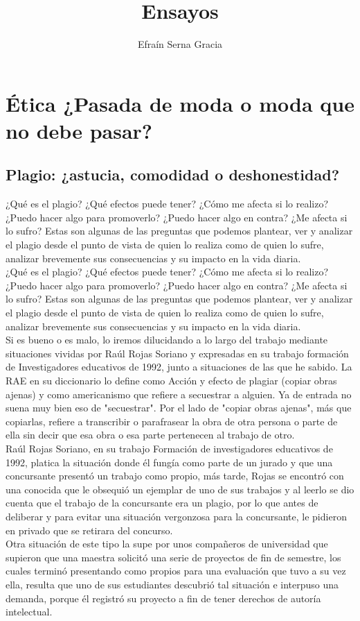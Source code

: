 \documentclass[12pt]{book} %
\title{Ensayos}
\author{Efraín Serna Gracia}
\begin{document}
\maketitle
\tableofcontents

\chapter{Ética ¿Pasada de moda o moda que no debe pasar?}

\section{Plagio: ¿astucia, comodidad o deshonestidad?}
¿Qué es el plagio? ¿Qué efectos puede tener? ¿Cómo me afecta si lo realizo? ¿Puedo hacer algo para promoverlo? ¿Puedo hacer algo en contra? ¿Me afecta si lo sufro? Estas son algunas de las preguntas que podemos plantear, ver y analizar el plagio desde el punto de vista de quien lo realiza como de quien lo sufre, analizar brevemente sus consecuencias y su impacto en la vida diaria.\\

¿Qué es el plagio? ¿Qué efectos puede tener? ¿Cómo me afecta si lo realizo? ¿Puedo hacer algo para promoverlo? ¿Puedo hacer algo en contra? ¿Me afecta si lo sufro? Estas son algunas de las preguntas que podemos plantear, ver y analizar el plagio desde el punto de vista de quien lo realiza como de quien lo sufre, analizar brevemente sus consecuencias y su impacto en la vida diaria.\\

Si es bueno o es malo, lo iremos dilucidando a lo largo del trabajo mediante situaciones vividas por Raúl Rojas Soriano y expresadas en su trabajo formación de Investigadores educativos de 1992, junto a situaciones de las que he sabido.
La RAE en su diccionario lo define como Acción y efecto de plagiar (copiar obras ajenas) y como americanismo que refiere a secuestrar a alguien. Ya de entrada no suena muy bien eso de "secuestrar". Por el lado de "copiar obras ajenas", más que copiarlas, refiere a transcribir o parafrasear la obra de otra persona o parte de ella sin decir que esa obra o esa parte pertenecen al trabajo de otro.\\

Raúl Rojas Soriano, en su trabajo Formación de investigadores educativos de 1992, platica la situación donde él fungía como parte de un jurado y que una concursante presentó un trabajo como propio, más tarde, Rojas se encontró con una conocida que le obsequió un ejemplar de uno de sus trabajos y al leerlo se dio cuenta que el trabajo de la concursante era un plagio, por lo que antes de deliberar y para evitar una situación vergonzosa para la concursante, le pidieron en privado que se retirara del concurso.\\
 Otra situación de este tipo la supe por unos compañeros de universidad que supieron que una maestra solicitó una serie de proyectos de fin de semestre, los cuales terminó presentando como propios para una evaluación que tuvo a su vez ella, resulta que uno de sus estudiantes descubrió tal situación e interpuso una demanda, porque él registró su proyecto a fin de tener derechos de autoría intelectual.\\
 
\end{document}
